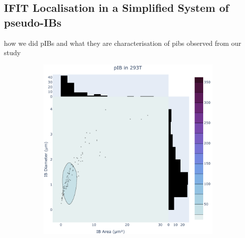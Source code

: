 \subsection{IFIT Localisation in a Simplified System of pseudo-IBs} \label{subsec:IFIT Localisation in a Simplified System of pseudo-IBs}
\lipsum[1-30]
how we did pIBs and what they are
characterisation of pibs observed from our study

\begin{figure}
    \begin{subfigure}{0.495\textwidth}
        \caption{}
        \includegraphics[width=\textwidth]{08. Chapter 3/Figs/03. pIB/01. pIB characterisation/01. heatmap_pib-293t.pdf} 
    \end{subfigure}
    \hfill
    \begin{subfigure}{0.495\textwidth}
        \caption{}

\end{subfigure}
\end{figure}
